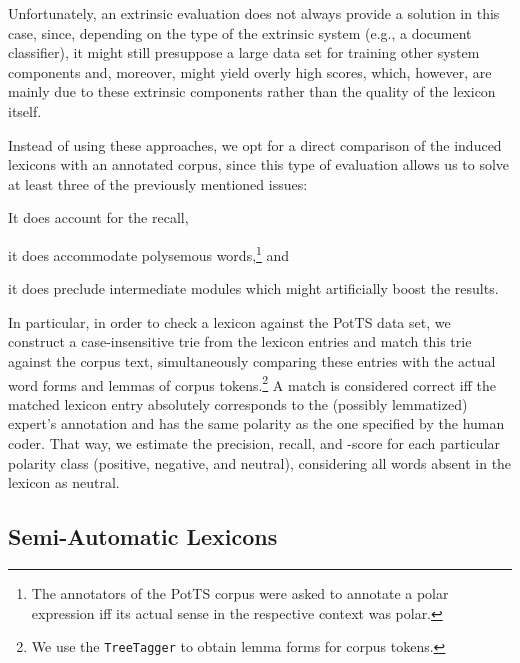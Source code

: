 Unfortunately, an extrinsic evaluation does not always provide a
solution in this case, since, depending on the type of the extrinsic
system (e.g., a document classifier), it might still presuppose a
large data set for training other system components and, moreover,
might yield overly high scores, which, however, are mainly due to
these extrinsic components rather than the quality of the lexicon
itself.

Instead of using these approaches, we opt for a direct comparison of
the induced lexicons with an annotated corpus, since this type of
evaluation allows us to solve at least three of the previously
mentioned issues:
\begin{inparaenum}[i)]
  \item It does account for the recall,
  \item it does accommodate polysemous words,\footnote{The annotators
      of the PotTS corpus were asked to annotate a polar expression
      iff its actual sense in the respective context was polar.} and
  \item it does preclude intermediate modules which might artificially
    boost the results.
\end{inparaenum}

In particular, in order to check a lexicon against the PotTS data set,
we construct a case-insensitive trie \cite[pp. 492--512]{Knuth:98}
from the lexicon entries and match this trie against the corpus text,
simultaneously comparing these entries with the actual word forms and
lemmas of corpus tokens.\footnote{We use the \texttt{TreeTagger}
  \cite{Schmid:95} to obtain lemma forms for corpus tokens.} A match
is considered correct iff the matched lexicon entry absolutely
corresponds to the (possibly lemmatized) expert's annotation and has
the same polarity as the one specified by the human coder.  That way,
we estimate the precision, recall, and \F{}-score for each particular
polarity class (positive, negative, and neutral), considering all
words absent in the lexicon as neutral.

\subsection{Semi-Automatic Lexicons}

